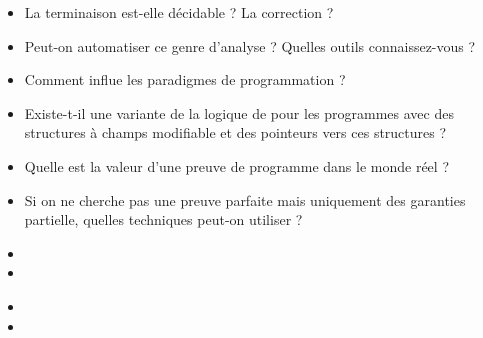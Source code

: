 \documentclass{agregfiche}
\begin{document}
\secquestionsclassiques

\begin{itemize}
	\item La terminaison est-elle décidable ? La correction ?
    \item Peut-on automatiser ce genre d'analyse ? Quelles outils 
    connaissez-vous ?
    \item Comment influe les paradigmes de programmation ?
    \item  Existe-t-il une variante de la logique de  pour 
    les programmes avec des structures à champs modifiable et des 
    pointeurs vers ces structures ?
    \item Quelle est la valeur d'une preuve de programme dans le 
    monde réel ?
    \item Si on ne cherche pas une preuve parfaite mais uniquement 
    des garanties partielle, quelles techniques peut-on utiliser ?
     
\end{itemize}

\secreferences

\begin{itemize}
\item 
\item 
\end{itemize}

\secdev

\begin{itemize}
\item 
\item 
\end{itemize}
\end{document}
